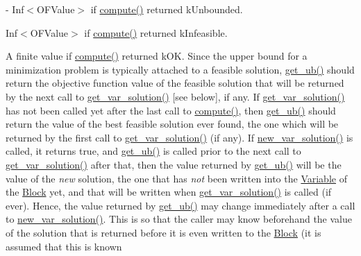 \begin{DoxyItemize}
\item -\/ Inf$<$\+O\+F\+Value$>$ if \mbox{\hyperlink{class_s_m_spp__di__unipi__it_1_1_solver_a504d4e3e174c7a518cc66156a8a45ce5}{compute()}} returned k\+Unbounded.
\item Inf$<$\+O\+F\+Value$>$ if \mbox{\hyperlink{class_s_m_spp__di__unipi__it_1_1_solver_a504d4e3e174c7a518cc66156a8a45ce5}{compute()}} returned k\+Infeasible.
\item A finite value if \mbox{\hyperlink{class_s_m_spp__di__unipi__it_1_1_solver_a504d4e3e174c7a518cc66156a8a45ce5}{compute()}} returned k\+OK. Since the upper bound for a minimization problem is typically attached to a feasible solution, \mbox{\hyperlink{class_s_m_spp__di__unipi__it_1_1_solver_a7304d819b2eeff3d4ba650055b24e3a5}{get\+\_\+ub()}} should return the objective function value of the feasible solution that will be returned by the next call to \mbox{\hyperlink{class_s_m_spp__di__unipi__it_1_1_solver_a91d7cd0dc4fa453406ef30db2bfa37a5}{get\+\_\+var\+\_\+solution()}} \mbox{[}see below\mbox{]}, if any. If \mbox{\hyperlink{class_s_m_spp__di__unipi__it_1_1_solver_a91d7cd0dc4fa453406ef30db2bfa37a5}{get\+\_\+var\+\_\+solution()}} has not been called yet after the last call to \mbox{\hyperlink{class_s_m_spp__di__unipi__it_1_1_solver_a504d4e3e174c7a518cc66156a8a45ce5}{compute()}}, then \mbox{\hyperlink{class_s_m_spp__di__unipi__it_1_1_solver_a7304d819b2eeff3d4ba650055b24e3a5}{get\+\_\+ub()}} should return the value of the best feasible solution ever found, the one which will be returned by the first call to \mbox{\hyperlink{class_s_m_spp__di__unipi__it_1_1_solver_a91d7cd0dc4fa453406ef30db2bfa37a5}{get\+\_\+var\+\_\+solution()}} (if any). If \mbox{\hyperlink{class_s_m_spp__di__unipi__it_1_1_solver_af109b504a566c90a4ea45c1574c128fe}{new\+\_\+var\+\_\+solution()}} is called, it returns true, and \mbox{\hyperlink{class_s_m_spp__di__unipi__it_1_1_solver_a7304d819b2eeff3d4ba650055b24e3a5}{get\+\_\+ub()}} is called prior to the next call to \mbox{\hyperlink{class_s_m_spp__di__unipi__it_1_1_solver_a91d7cd0dc4fa453406ef30db2bfa37a5}{get\+\_\+var\+\_\+solution()}} after that, then the value returned by \mbox{\hyperlink{class_s_m_spp__di__unipi__it_1_1_solver_a7304d819b2eeff3d4ba650055b24e3a5}{get\+\_\+ub()}} will be the value of the {\itshape new} solution, the one that has {\itshape not} been written into the \mbox{\hyperlink{class_s_m_spp__di__unipi__it_1_1_variable}{Variable}} of the \mbox{\hyperlink{class_s_m_spp__di__unipi__it_1_1_block}{Block}} yet, and that will be written when \mbox{\hyperlink{class_s_m_spp__di__unipi__it_1_1_solver_a91d7cd0dc4fa453406ef30db2bfa37a5}{get\+\_\+var\+\_\+solution()}} is called (if ever). Hence, the value returned by \mbox{\hyperlink{class_s_m_spp__di__unipi__it_1_1_solver_a7304d819b2eeff3d4ba650055b24e3a5}{get\+\_\+ub()}} may change immediately after a call to \mbox{\hyperlink{class_s_m_spp__di__unipi__it_1_1_solver_af109b504a566c90a4ea45c1574c128fe}{new\+\_\+var\+\_\+solution()}}. This is so that the caller may know beforehand the value of the solution that is returned before it is even written to the \mbox{\hyperlink{class_s_m_spp__di__unipi__it_1_1_block}{Block}} (it is assumed that this is known 
\end{DoxyItemize}
